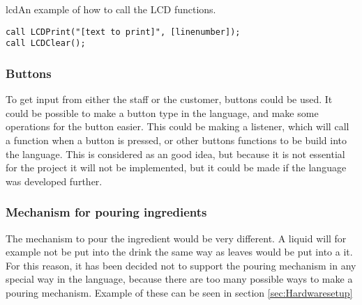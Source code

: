 \begin{code}{lcd}{An example of how to call the LCD functions.}
\begin{lstlisting}[mathescape]
call LCDPrint("[text to print]", [linenumber]);
call LCDClear();
\end{lstlisting}
\end{code}

\subsubsection{Buttons}
To get input from either the staff or the customer, buttons could be used. It could be possible to make a button type in the language, and make some operations for the button easier. This could be making a listener, which will call a function when a button is pressed, or other buttons functions to be build into the language. This is considered as an good idea, but because it is not essential for the project it will not be implemented, but it could be made if the language was developed further.

\subsubsection{Mechanism for pouring ingredients}
The mechanism to pour the ingredient would be very different. A liquid will for example not be put into the drink the same way as leaves would be put into a it. For this reason, it has been decided not to support the pouring mechanism in any special way in the language, because there are too many possible ways to make a pouring mechanism. Example of these can be seen in section \ref{sec:Hardwaresetup}